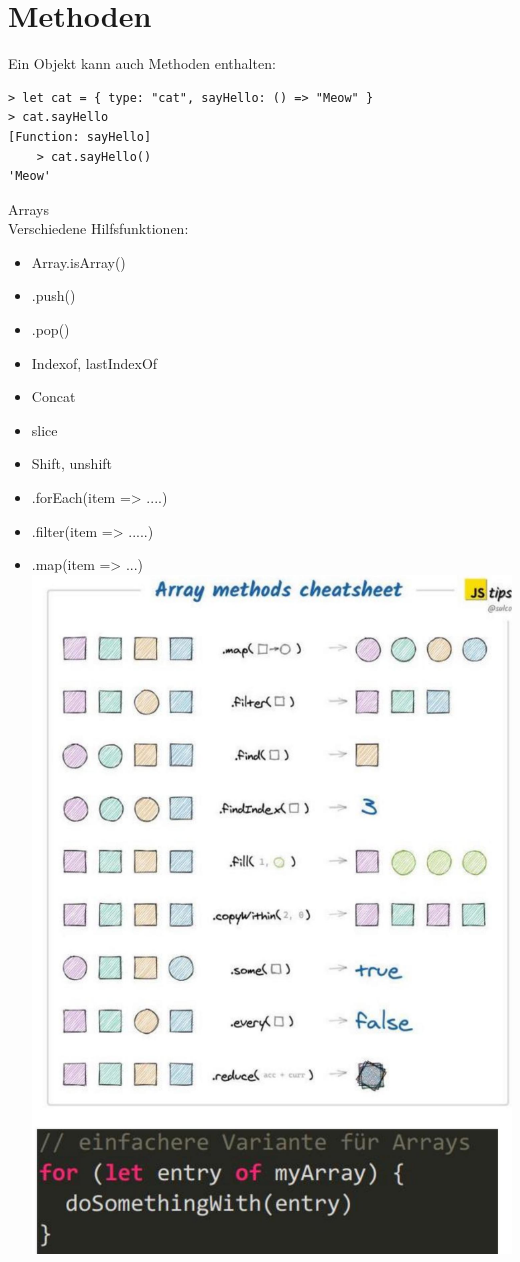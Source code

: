 \documentclass[10pt]{article}
\begin{document}
\section*{Methoden}
Ein Objekt kann auch Methoden enthalten:

\begin{verbatim}
> let cat = { type: "cat", sayHello: () => "Meow" }
> cat.sayHello
[Function: sayHello]
    > cat.sayHello()
'Meow'
\end{verbatim}

Arrays\\
Verschiedene Hilfsfunktionen:

\begin{itemize}
  \item Array.isArray()
  \item .push()
  \item .pop()
  \item Indexof, lastIndexOf
  \item Concat
  \item slice
  \item Shift, unshift
  \item .forEach(item => ....)
  \item .filter(item => .....)
  \item .map(item => ...)\\
\includegraphics[width=\linewidth]{images/2024_12_29_858f09cde51177c71657g-08}
\end{itemize}
\end{document}

